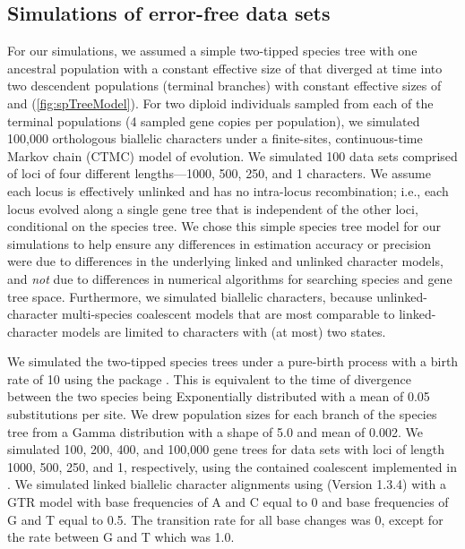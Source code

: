 \subsection{Simulations of error-free data sets}
For our simulations, we assumed a simple two-tipped species tree with one 
ancestral population with a constant effective size of \rootpopsize that 
diverged at time \divtime into two descendent populations (terminal branches) 
with constant effective sizes of \tippopsize[1] and \tippopsize[2] (\cref{fig:spTreeModel}).
For two diploid individuals sampled from each of the terminal
populations (4 sampled gene copies per population),
we simulated 100,000 orthologous biallelic characters under a finite-sites,
continuous-time Markov chain (CTMC) model of evolution.
We simulated 100 data sets comprised of loci of four different lengths---1000,
500, 250, and 1 characters.
We assume each locus is effectively unlinked and has no intra-locus
recombination; i.e., each locus evolved along a single gene tree that is
independent of the other loci, conditional on the species tree.
We chose this simple species tree model for our simulations to help ensure any
differences in estimation accuracy or precision were due to differences in the
underlying linked and unlinked character models,
and \emph{not} due to differences in numerical algorithms for searching species
and gene tree space.
Furthermore, we simulated biallelic characters, because unlinked-character
multi-species coalescent models
\parencite{bryant2012,oaks2019}
that are most comparable to linked-character models
\parencite{heled2010,ogilvie2017}
are limited to characters with (at most) two states.

We simulated the two-tipped species trees under a pure-birth process
\parencite{yule1925} with a birth rate of 10 using the \python package \dendropy
\parencite[Version 4.40, Commit eb69003;][]{sukumaran2010}.
This is equivalent to the time of divergence between the two species being
Exponentially distributed with a mean of 0.05 substitutions per site.
We drew population sizes for each branch of the species tree from a Gamma 
distribution with a shape of 5.0 and mean of 0.002.
We simulated 100, 200, 400, and 100,000 gene trees for data sets with loci of
length 1000, 500, 250, and 1, respectively, using the contained coalescent
implemented in \dendropy.
We simulated linked biallelic character alignments using
\seqgen (Version 1.3.4)
\parencite{rambaut1997}
with a GTR model with base frequencies of A and C equal to 0 and base 
frequencies of G and T equal to 0.5.
The transition rate for all base changes was 0, except for the rate between G
and T which was 1.0. 

